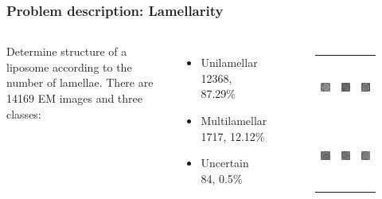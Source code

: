 \documentclass{beamer}
\begin{document}
\begin{frame}
\frametitle{Problem description: Lamellarity}

\begin{columns}
Determine structure of a liposome according to the number of lamellae.
\vskip 0.2in
There are 14169 EM images and three classes:
\begin{itemize}
\item Unilamellar \\ 12368, 87.29\%
\item Multilamellar \\ 1717, 12.12\%
\item Uncertain \\ 84, 0.5\%
\end{itemize}
\begin{figure}[H]
\centering
\begin{tabular}{ccc}
	\includegraphics[height=2cm, keepaspectratio]{problem_description/lamellarity/uni} & \includegraphics[height=2cm, keepaspectratio]{problem_description/lamellarity/multi} & \includegraphics[height=2cm, keepaspectratio]{problem_description/lamellarity/uncertain} \\
	\includegraphics[height=2cm, keepaspectratio]{problem_description/lamellarity/uni2} & \includegraphics[height=2cm, keepaspectratio]{problem_description/lamellarity/multi2} & \includegraphics[height=2cm, keepaspectratio]{problem_description/lamellarity/uncertain2} \\

\end{tabular}
\end{figure}
\end{columns}
\end{frame}
\end{document}
